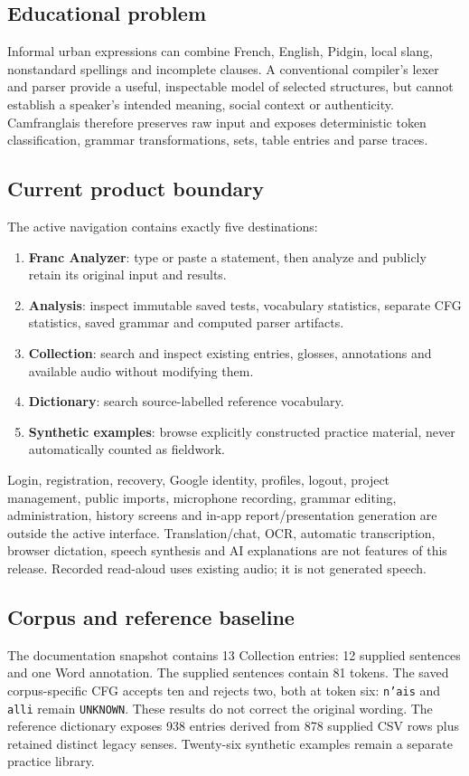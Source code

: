 \documentclass[11pt]{article}
\begin{document}
\subsection{Educational problem}
Informal urban expressions can combine French, English, Pidgin, local slang,
nonstandard spellings and incomplete clauses. A conventional compiler's lexer
and parser provide a useful, inspectable model of selected structures, but
cannot establish a speaker's intended meaning, social context or authenticity.
Camfranglais therefore preserves raw input and exposes deterministic token
classification, grammar transformations, sets, table entries and parse traces.

\subsection{Current product boundary}
The active navigation contains exactly five destinations:
\begin{enumerate}
\item \textbf{Franc Analyzer}: type or paste a statement, then analyze and
publicly retain its original input and results.
\item \textbf{Analysis}: inspect immutable saved tests, vocabulary statistics,
separate CFG statistics, saved grammar and computed parser artifacts.
\item \textbf{Collection}: search and inspect existing entries, glosses,
annotations and available audio without modifying them.
\item \textbf{Dictionary}: search source-labelled reference vocabulary.
\item \textbf{Synthetic examples}: browse explicitly constructed practice
material, never automatically counted as fieldwork.
\end{enumerate}

Login, registration, recovery, Google identity, profiles, logout, project
management, public imports, microphone recording, grammar editing, administration,
history screens and in-app report/presentation generation are outside the active
interface. Translation/chat, OCR, automatic transcription, browser dictation,
speech synthesis and AI explanations are not features of this release.
Recorded read-aloud uses existing audio; it is not generated speech.

\subsection{Corpus and reference baseline}
The documentation snapshot contains 13 Collection entries: 12 supplied
sentences and one Word annotation. The supplied sentences contain 81 tokens.
The saved corpus-specific CFG accepts ten and rejects two, both at token six:
\texttt{n'ais} and \texttt{alli} remain \texttt{UNKNOWN}. These results do not
correct the original wording. The reference dictionary exposes 938 entries
derived from 878 supplied CSV rows plus retained distinct legacy senses.
Twenty-six synthetic examples remain a separate practice library.
\end{document}
